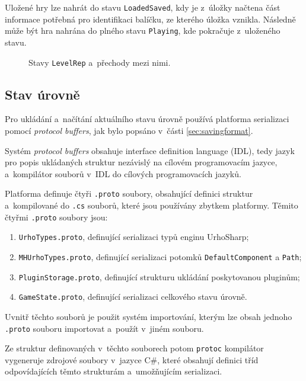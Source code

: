 Uložené hry lze nahrát do stavu \texttt{LoadedSaved}, kdy je z~úložky načtena část informace potřebná pro identifikaci balíčku, ze kterého úložka vznikla. Následně může být hra nahrána do plného stavu \texttt{Playing}, kde pokračuje z~uloženého stavu.

\begin{figure}[h]
	\centering
	\fontsize{8pt}{11pt}\selectfont
	\def\svgwidth{\textwidth}
	
	\caption{Stavy \texttt{LevelRep} a~přechody mezi nimi.}
	\label{fig:levelrepstates}
\end{figure}

\subsection{Stav úrovně}
Pro ukládání a~načítání aktuálního stavu úrovně používá platforma serializaci pomocí \textit{protocol buffers}, jak bylo popsáno v~části \ref{sec:savingformat}. 

Systém \textit{protocol buffers} obsahuje interface definition language (IDL), tedy jazyk pro popis ukládaných struktur nezávislý na cílovém programovacím jazyce, a~kompilátor souborů v~IDL do cílových programovacích jazyků. 

Platforma definuje čtyři \texttt{.proto} soubory, obsahující definici struktur a~kompilované do \texttt{.cs} souborů, které jsou používány zbytkem platformy. Těmito čtyřmi \texttt{.proto} soubory jsou:

\begin{enumerate}
	\item \texttt{UrhoTypes.proto}, definující serializaci typů enginu UrhoSharp;
	\item \texttt{MHUrhoTypes.proto}, definující serializaci potomků \texttt{DefaultComponent} a \texttt{Path};
	\item \texttt{PluginStorage.proto}, definující strukturu ukládání poskytovanou pluginům;
	\item \texttt{GameState.proto}, definující serializaci celkového stavu úrovně.
\end{enumerate}

Uvnitř těchto souborů je použit systém importování, kterým lze obsah jednoho \texttt{.proto} souboru importovat a~použít v~jiném souboru. 

Ze struktur definovaných v~těchto souborech potom \texttt{protoc} kompilátor vygeneruje zdrojové soubory v~jazyce C\#, které obsahují definici tříd odpovídajících těmto strukturám a~umožňujícím serializaci.

